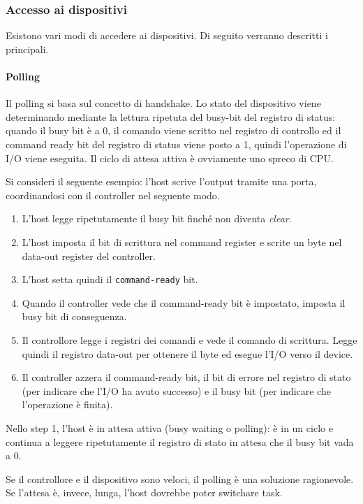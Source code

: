 \documentclass[a4paper]{article}
\begin{document}
\subsubsection{Accesso ai dispositivi}
Esistono vari modi di accedere ai dispositivi. Di seguito verranno descritti i principali.

\paragraph{Polling}
Il polling si basa sul concetto di handshake. Lo stato del dispositivo viene determinando mediante la lettura ripetuta del busy-bit del registro di status: quando il busy bit è a 0, il comando viene scritto nel registro di controllo ed il command ready bit del registro di status viene posto a 1, quindi l'operazione di I/O viene eseguita. Il ciclo di attesa attiva è ovviamente uno spreco di CPU.

Si consideri il seguente esempio: l'host scrive l'output tramite una porta, coordinandosi con il controller nel seguente modo.
\begin{enumerate}
   \item L'host legge ripetutamente il busy bit finché non diventa \textit{clear}.
   \item L'host imposta il bit di scrittura nel command register e scrite un byte nel data-out register del controller.
   \item L'host setta quindi il \texttt{command-ready} bit.
   \item Quando il controller vede che il command-ready bit è impostato, imposta il busy bit di conseguenza.
   \item Il controllore legge i registri dei comandi e vede il comando di scrittura. Legge quindi il registro data-out per ottenere il byte ed esegue l'I/O verso il device.
   \item Il controller azzera il command-ready bit, il bit di errore nel registro di stato (per indicare che l'I/O ha avuto successo) e il busy bit (per indicare che l'operazione è finita).
\end{enumerate}

Nello step 1, l'host è in attesa attiva (busy waiting o polling): è in un ciclo e continua a leggere ripetutamente il registro di stato in attesa che il busy bit vada a 0.

Se il controllore e il dispositivo sono veloci, il polling è una soluzione ragionevole. Se l'attesa è, invece, lunga, l'host dovrebbe poter switchare task.
\end{document}
